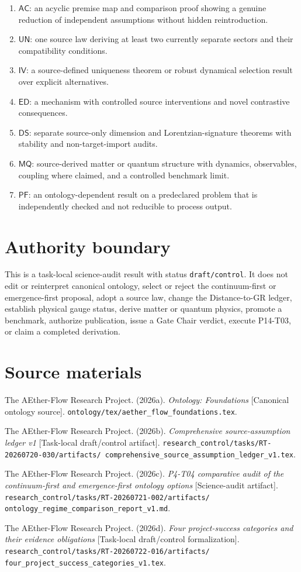 \documentclass[11pt]{article}
\newcommand{\AC}{\mathsf{AC}}
\newcommand{\UN}{\mathsf{UN}}
\newcommand{\IV}{\mathsf{IV}}
\newcommand{\ED}{\mathsf{ED}}
\newcommand{\DS}{\mathsf{DS}}
\newcommand{\MQ}{\mathsf{MQ}}
\newcommand{\PF}{\mathsf{PF}}
\begin{document}
\begin{enumerate}[leftmargin=*]
  \item \(\AC\): an acyclic premise map and comparison proof showing a genuine
  reduction of independent assumptions without hidden reintroduction.
  \item \(\UN\): one source law deriving at least two currently separate
  sectors and their compatibility conditions.
  \item \(\IV\): a source-defined uniqueness theorem or robust dynamical
  selection result over explicit alternatives.
  \item \(\ED\): a mechanism with controlled source interventions and novel
  contrastive consequences.
  \item \(\DS\): separate source-only dimension and Lorentzian-signature
  theorems with stability and non-target-import audits.
  \item \(\MQ\): source-derived matter or quantum structure with dynamics,
  observables, coupling where claimed, and a controlled benchmark limit.
  \item \(\PF\): an ontology-dependent result on a predeclared problem that is
  independently checked and not reducible to process output.
\end{enumerate}

\section{Authority boundary}

This is a task-local science-audit result with status
\texttt{draft/control}.  It does not edit or reinterpret canonical ontology,
select or reject the continuum-first or emergence-first proposal, adopt a
source law, change the Distance-to-GR ledger, establish physical gauge status,
derive matter or quantum physics, promote a benchmark, authorize publication,
issue a Gate Chair verdict, execute P14-T03, or claim a completed derivation.

\section*{Source materials}

The AEther-Flow Research Project. (2026a). \emph{Ontology: Foundations}
[Canonical ontology source].
\texttt{ontology/tex/aether\_flow\_foundations.tex}.

The AEther-Flow Research Project. (2026b). \emph{Comprehensive
source-assumption ledger v1} [Task-local draft/control artifact].
\texttt{research\_control/tasks/RT-20260720-030/artifacts/
comprehensive\_source\_assumption\_ledger\_v1.tex}.

The AEther-Flow Research Project. (2026c). \emph{P4-T04 comparative audit of
the continuum-first and emergence-first ontology options} [Science-audit
artifact].
\texttt{research\_control/tasks/RT-20260721-002/artifacts/
ontology\_regime\_comparison\_report\_v1.md}.

The AEther-Flow Research Project. (2026d). \emph{Four project-success
categories and their evidence obligations} [Task-local draft/control
formalization].
\texttt{research\_control/tasks/RT-20260722-016/artifacts/
four\_project\_success\_categories\_v1.tex}.
\end{document}
